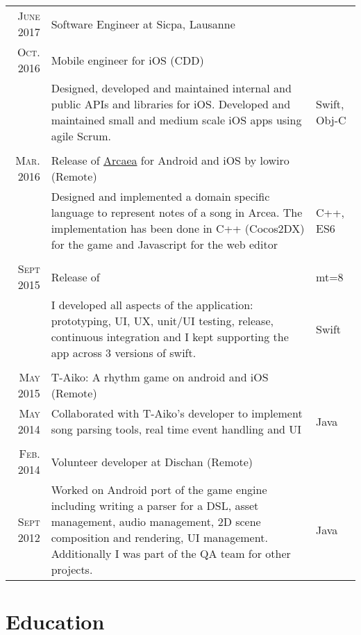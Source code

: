 \documentclass[a4paper,10pt]{article} %
\begin{document}
\begin{tabular}{r|p{9.3cm}|l}
\textsc{June 2017} & Software Engineer at Sicpa, Lausanne\\
\textsc{Oct. 2016} & Mobile engineer for iOS (CDD)\\ 
& \footnotesize{Designed, developed and maintained internal and public APIs and libraries for iOS. Developed and maintained small and medium scale iOS apps using agile Scrum.} & Swift, Obj-C\\
\\
\textsc{Mar. 2016}  & Release of \href{https://arcaea.lowiro.com}{Arcaea} for Android and iOS by lowiro (Remote)& \\
& \footnotesize{Designed and implemented a domain specific language to represent notes of a song in Arcea. The implementation has been done in C++ (Cocos2DX) for the game and Javascript for the web editor} & C++, ES6\\
\\
\textsc{Sept 2015} & Release of \href{https://itunes.apple.com/us/app/hackerspaces/id1035583993?ls=1&mt=8}{Hackerspaces} for iOS &\\
& \footnotesize{I developed all aspects of the application: prototyping, UI, UX, unit/UI testing, release, continuous integration and I kept supporting the app across 3 versions of swift.} & Swift\\
\\
\textsc{May 2015} & T-Aiko: A rhythm game on android and iOS (Remote) & \\
\textsc{May 2014} & \footnotesize{Collaborated with T-Aiko's developer to implement song parsing tools, real time event handling and UI} & Java\\
\\
\textsc{Feb. 2014} & Volunteer developer at Dischan (Remote)\\
\textsc{Sept 2012} & \footnotesize{Worked on Android port of the game engine including writing a parser for a DSL, asset management, audio management, 2D scene composition and rendering, UI management. Additionally I was part of the QA team for other projects.} & Java
\end{tabular}


\section{Education}
\end{document}
